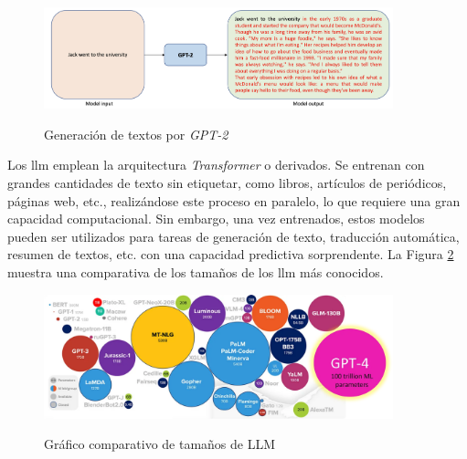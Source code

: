\begin{figure}[H]
    \caption{Generación de textos por \emph{GPT-2}}
    \centering
    \includegraphics[width=0.9\textwidth]{./figuras/GPT2_text_generation.png}
    \label{fig:gpt2_text_generation}
\end{figure}

Los \gls{llm} emplean la arquitectura \emph{Transformer} o derivados. Se entrenan con grandes cantidades de texto sin etiquetar, como libros, artículos de periódicos, páginas web, etc., realizándose este proceso en paralelo, lo que requiere una gran capacidad computacional. Sin embargo, una vez entrenados, estos modelos pueden ser utilizados para tareas de generación de texto, traducción automática, resumen de textos, etc. con una capacidad predictiva sorprendente. La Figura \ref{fig:llm_sizes} muestra una comparativa de los tamaños de los \gls{llm} más conocidos.

\begin{figure}[H]
    \caption{Gráfico comparativo de tamaños de LLM}
    \centering
    \includegraphics[width=0.9\textwidth]{./figuras/LLMs_sizes.png}
    \label{fig:llm_sizes}
\end{figure}

